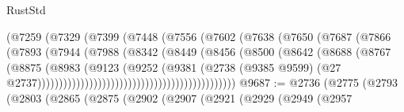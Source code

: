 \begin{lexlean}{RustStd}
\begin{coremodule}
                                          (@7259
                                            (@7329
                                              (@7399
                                                (@7448
                                                  (@7556
                                                    (@7602
                                                      (@7638
                                                        (@7650
                                                          (@7687
                                                            (@7866
                                                              (@7893
                                                                (@7944
                                                                  (@7988
                                                                    (@8342
                                                                      (@8449
                                                                        (@8456
                                                                          (@8500
                                                                            (@8642
                                                                              (@8688
                                                                                (@8767
                                                                                  (@8875
                                                                                    (@8983
                                                                                      (@9123
                                                                                        (@9252
                                                                                          (@9381
                                                                                            (@2738
                                                                                              (@9385
                                                                                                @9599)
                                                                                              (@27
                                                                                                @2737))))))))))))))))))))))))))))))))))))))))))))))
@9687 := @2736
    (@2775
      (@2793
        (@2803
          (@2865
            (@2875
              (@2902
                (@2907
                  (@2921
                    (@2929
                      (@2949
                        (@2957

\end{coremodule}
\end{lexlean}
